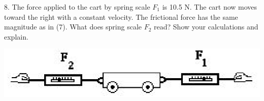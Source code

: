 8. The force applied to the cart by spring scale \( F_{1} \) is 10.5 N.
The cart now moves toward the right with a constant velocity. The frictional
force has the same magnitude as in (7). What does spring scale \( F_{2} \)
read? Show your calculations and explain.

\includegraphics{combining/combining_fig4.eps}

